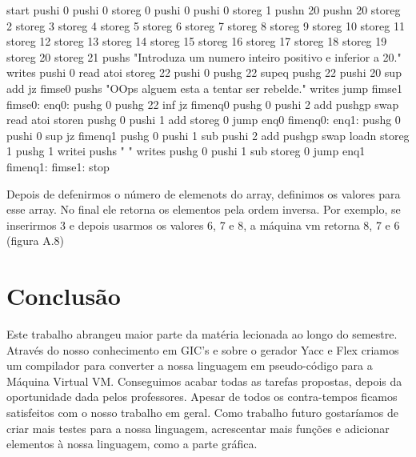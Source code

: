 \documentclass{report}
\begin{document}
\begin{enumerate}
 	\begin{code}
 		start
 		pushi 0
 		pushi 0
 		storeg 0
 		pushi 0
 		pushi 0
 		storeg 1
 		pushn 20
 		pushn 20
 		storeg 2
 		storeg 3
 		storeg 4
 		storeg 5
 		storeg 6
 		storeg 7
 		storeg 8
 		storeg 9
 		storeg 10
 		storeg 11
 		storeg 12
 		storeg 13
 		storeg 14
 		storeg 15
 		storeg 16
 		storeg 17
 		storeg 18
 		storeg 19
 		storeg 20
 		storeg 21
 		pushs "Introduza um numero inteiro positivo e inferior a 20.\n"
 		writes
 		pushi 0
 		read
 		atoi
 		storeg 22
 		pushi 0
 		pushg 22
 		supeq
 		pushg 22
 		pushi 20
 		sup
 		add
 		jz fimse0
 		pushs "OOps alguem esta a tentar ser rebelde.\n"
 		writes
 		jump fimse1
 		fimse0:
 		enq0:
 		pushg 0
 		pushg 22
 		inf
 		jz fimenq0
 		pushg 0
 		pushi 2
 		add
 		pushgp
 		swap
 		read
 		atoi
 		storen
 		pushg 0
 		pushi 1
 		add
 		storeg 0
 		jump enq0
 		fimenq0:
 		enq1:
 		pushg 0
 		pushi 0
 		sup
 		jz fimenq1
 		pushg 0
 		pushi 1
 		sub
 		pushi 2
 		add
 		pushgp
 		swap
 		loadn
 		storeg 1
 		pushg 1
 		writei
 		pushs " \n"
 		writes
 		pushg 0
 		pushi 1
 		sub
 		storeg 0
 		jump enq1
 		fimenq1:
 		fimse1:
 		stop
 		
 	
	\end{code}
	\indent
	Depois de defenirmos o número de elemenots do array, definimos os valores para esse array. No final ele retorna os elementos pela ordem inversa. Por exemplo, se inserirmos 3 e depois usarmos os valores 6, 7 e 8, a máquina vm retorna 8, 7 e 6 (figura A.8)
	
	

\end{enumerate}
  





\chapter{Conclusão} \label{concl}
 \indent
 Este trabalho abrangeu maior parte da matéria lecionada ao longo do semestre. Através do nosso conhecimento em GIC's e sobre o gerador Yacc e Flex criamos um compilador para converter a nossa linguagem em pseudo-código para a Máquina Virtual VM. Conseguimos acabar todas as tarefas propostas, depois da oportunidade dada pelos professores. Apesar de todos os contra-tempos ficamos satisfeitos com o nosso trabalho em geral.
 \indent
 Como trabalho futuro gostaríamos de criar mais testes para a nossa linguagem, acrescentar mais funções e adicionar elementos à nossa linguagem, como a parte gráfica.  
\end{document}
